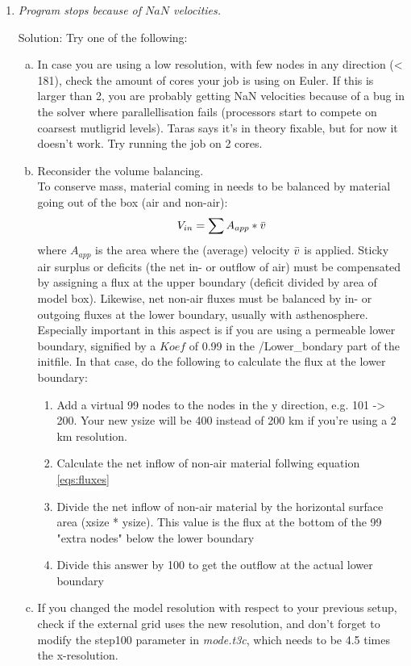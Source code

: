 \begin{enumerate}[-]
\item \textit{Program stops because of $NaN$ velocities.}


Solution: Try one of the following:

\begin{enumerate}[a)]
    \item In case you are using a low resolution, with few nodes in any direction (< 181), check the amount of cores your job is using on Euler. If this is larger than 2, you are probably getting NaN velocities because of a bug in the solver where parallellisation fails (processors start to compete on coarsest mutligrid levels). Taras says it's in theory fixable, but for now it doesn't work. Try running the job on 2 cores. 
    \item Reconsider the volume balancing. \\
To conserve mass, material coming in needs to be balanced by material going out of the box (air and non-air):
\begin{equation}\label{eqs:fluxes}
    V_{in} = \sum{A_{app} * \Bar{v}}
\end{equation}
where $A_{app}$ is the area where the (average) velocity $\Bar{v}$ is applied. Sticky air surplus or deficits (the net in- or outflow of air) must be compensated by assigning a flux at the upper boundary (deficit divided by area of model box). Likewise, net non-air fluxes must be balanced by in- or outgoing fluxes at the lower boundary, usually with asthenosphere. Especially important in this aspect is if you are using a permeable lower boundary, signified by a $Koef$ of 0.99 in the /Lower\_bondary part of the initfile. In that case, do the following to calculate the flux at the lower boundary:
\begin{enumerate}
    \item Add a virtual 99 nodes to the nodes in the y direction, e.g. 101 -> 200. Your new ysize will be 400 instead of 200 km if you're using a 2 km resolution. 
    \item Calculate the net inflow of non-air material follwing equation \ref{eqs:fluxes}
    \item Divide the net inflow of non-air material by the horizontal surface area (xsize * ysize). This value is the flux at the bottom of the 99 "extra nodes" below the lower boundary
    \item Divide this answer by 100 to get the outflow at the actual lower boundary
\end{enumerate}

\item If you changed the model resolution with respect to your previous setup, check if the external grid uses the new resolution, and don't forget to modify the step100 parameter in \textit{mode.t3c}, which needs to be 4.5 times the x-resolution. 

\end{enumerate}  

\end{enumerate}